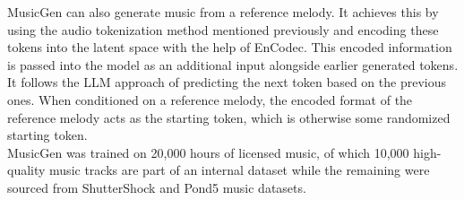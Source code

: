 \documentclass[conference]{IEEEtran}
\begin{document}
{MusicGen can also generate music from a reference melody. It achieves this by using the audio tokenization method mentioned previously and encoding these tokens into the latent space with the help of EnCodec. This encoded information is passed into the model as an additional input alongside earlier generated tokens. It follows the LLM approach of predicting the next token based on the previous ones. When conditioned on a reference melody, the encoded format of the reference melody acts as the starting token, which is otherwise some randomized starting token.
\\

MusicGen was trained on 20,000 hours of licensed music, of which 10,000 high-quality music tracks are part of an internal dataset while the remaining were sourced from ShutterShock and Pond5 music datasets.
}
\end{document}
